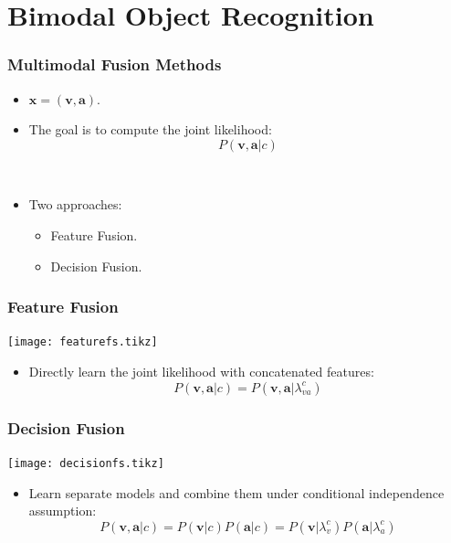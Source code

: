 \documentclass[t]{beamer}
\begin{document}
\section{Bimodal Object Recognition}
\begin{frame}
  \frametitle{Multimodal Fusion Methods}

  \begin{itemize}
    \item $\mathbf{x} = (\mathbf{v},\mathbf{a})$.
    \item The goal is to compute the joint likelihood:
      \[ P(\mathbf{v},\mathbf{a}|c) \]

      ~
    \item Two approaches:
      \begin{itemize}
        \item Feature Fusion.
        \item Decision Fusion.
      \end{itemize}
  \end{itemize}
\end{frame}

\begin{frame}
  \frametitle{Feature Fusion}

  \begin{center}
    \tiny
    \texttt{[image: featurefs.tikz]}
  \end{center}

  \begin{itemize}
    \item Directly learn the joint likelihood with concatenated features:
      \[ P(\mathbf{v},\mathbf{a}|c) = P(\mathbf{v},\mathbf{a}|\lambda_{va}^c) \]
  \end{itemize}
\end{frame}

\begin{frame}
  \frametitle{Decision Fusion}

  \begin{center}
    \tiny
    \texttt{[image: decisionfs.tikz]}
  \end{center}

  \begin{itemize}
    \item Learn separate models and combine them under conditional independence assumption:
      \[ P(\mathbf{v},\mathbf{a}|c) = P(\mathbf{v}|c) P(\mathbf{a}|c) = P(\mathbf{v}|\lambda_v^c) P(\mathbf{a}|\lambda_a^c) \]
  \end{itemize}
\end{frame}
\end{document}
